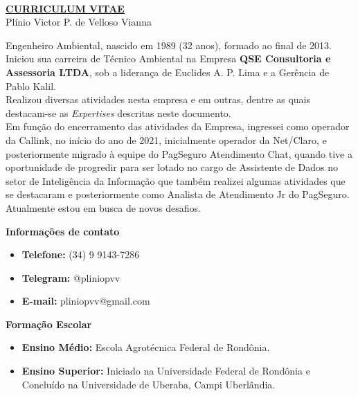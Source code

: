 \documentclass[12pt,a4paper,oneside,sumario=tradicional,brazil]{abntex2}
\begin{document}

\

\vspace{5cm}
\begin{center}
	\textbf{\underline{{\HUGE CURRICULUM VITAE}}} \\
	\vspace{1cm}
	{\large Plínio Victor P. de Velloso Vianna}	
\end{center}

\newpage
\textual

Engenheiro Ambiental, nascido em 1989 (32 anos), formado ao final de 2013. Iniciou sua carreira de Técnico Ambiental na Empresa \textbf{QSE Consultoria e Assessoria LTDA}, sob a liderança de Euclides A. P. Lima e a Gerência de Pablo Kalil. \\
\indent
Realizou diversas atividades nesta empresa e em outras, dentre as quais destacam-se as \textit{Expertises} descritas neste documento. \\
\indent
Em função do encerramento das atividades da Empresa, ingressei como operador da Callink, no início do ano de 2021, inicialmente operador da Net/Claro, e posteriormente migrado à equipe do PagSeguro Atendimento Chat, quando tive a oportunidade de progredir para ser lotado no cargo de Assistente de Dados no setor de Inteligência da Informação que também realizei algumas atividades que se destacaram e posteriormente como Analista de Atendimento Jr do PagSeguro. \\
Atualmente estou em busca de novos desafios.

\begin{center}
	\textbf{{\Large Informações de contato}} \\
\end{center}
\begin{itemize}
	\item \textbf{Telefone:} (34) 9 9143-7286 \\
	\vspace{-1cm}
	\item \textbf{Telegram:} @pliniopvv \\
	\vspace{-1cm}
	\item \textbf{E-mail:} pliniopvv@gmail.com \\
\end{itemize}


\begin{center}
	\textbf{{\Large Formação Escolar}} \\
\end{center}
\begin{itemize}
	\item \textbf{Ensino Médio:} Escola Agrotécnica Federal de Rondônia. \\
	\vspace{-1cm}
	\item \textbf{Ensino Superior:} Iniciado na Universidade Federal de Rondônia e Concluído na Universidade de Uberaba, Campi Uberlândia. \\
\end{itemize}
\end{document}
